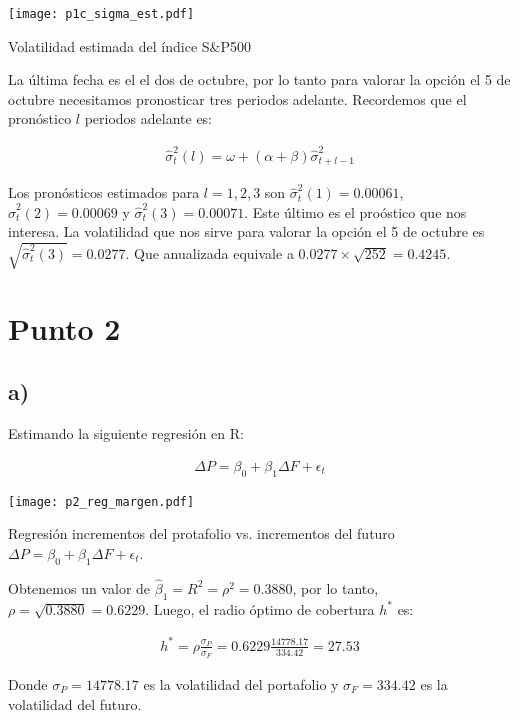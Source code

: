 \documentclass{tufte-handout}
\begin{document}
\begin{marginfigure}
	\texttt{[image: p1c\_sigma\_est.pdf]}
	\caption{Volatilidad estimada del índice S\&P500}
\end{marginfigure}

La última fecha es el el dos de octubre, por lo tanto para valorar la opción el 5 de octubre necesitamos pronosticar tres periodos adelante. Recordemos que el pronóstico $l$ periodos adelante es:

\begin{align*}
	\hat{\sigma}_t^2(l) = \omega + (\alpha + \beta) \hat{\sigma}_{t+l-1}^2
\end{align*}

Los pronósticos estimados para $l=1,2,3$ son $\hat{\sigma}_t^2(1) = 0.00061$, $\hat{\sigma}_t^2(2) = 0.00069$ y $\hat{\sigma}_t^2(3) = 0.00071$. Este último es el proóstico que nos interesa. La volatilidad que nos sirve para valorar la opción el 5 de octubre es $\sqrt{\hat{\sigma}_t^2(3)} = 0.0277$. Que anualizada equivale a $0.0277\times \sqrt{252} = 0.4245$.


\section*{Punto 2}

\subsection*{a)}

Estimando la siguiente regresión en R:

\begin{align*}
	\Delta P = \beta_0 + \beta_1 \Delta F + \epsilon_t
\end{align*}

\begin{marginfigure}
	\texttt{[image: p2\_reg\_margen.pdf]}
	\caption{Regresión incrementos del protafolio vs. incrementos del futuro $\Delta P = \beta_0 + \beta_1 \Delta F + \epsilon_t$.}
\end{marginfigure}

Obtenemos un valor de $\hat{\beta}_1=R^2=\rho^2=0.3880$, por lo tanto, $\rho=\sqrt{0.3880}=0.6229$. Luego, el radio óptimo de cobertura $h^*$ es:

\begin{align*}
	h^* = \rho \frac{\sigma_P}{\sigma_F} = 0.6229 \frac{14778.17}{334.42} = 27.53
\end{align*}

Donde $\sigma_P = 14778.17$ es la volatilidad del portafolio y $\sigma_F = 334.42$ es la volatilidad del futuro.
\end{document}
